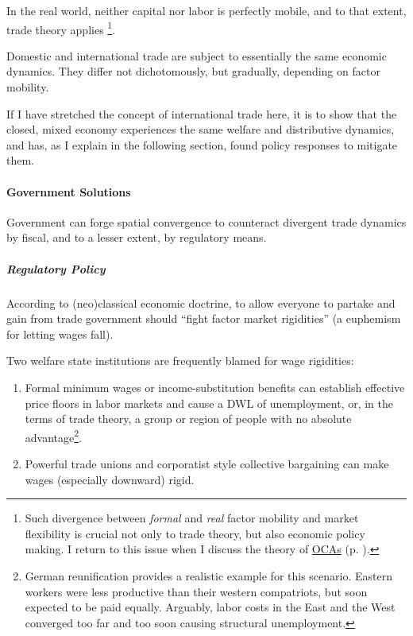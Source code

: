 In the real world, neither capital nor labor is perfectly mobile, and to that extent, trade theory applies \footnote{
	Such divergence between \emph{formal} and \emph{real} factor mobility and market flexibility is crucial not only to trade theory, but also economic policy making. I return to this issue when I discuss the theory of \hyperref[sec:OCA]{\glspl{OCA}} (p. \pageref{sec:OCA}).}. 

Domestic and international trade are subject to essentially the same economic dynamics. They differ not dichotomously, but gradually, depending on factor mobility. 

If I have stretched the concept of international trade here, it is to show that the closed, mixed economy experiences the same welfare and distributive dynamics, and has, as I explain in the following section, found policy responses to mitigate them.

\paragraph{Government Solutions} Government can forge spatial convergence to counteract divergent trade dynamics by fiscal, and to a lesser extent, by regulatory means.

\subparagraph{Regulatory Policy} According to (neo)classical economic doctrine, to allow everyone to partake and gain from trade government should ``fight factor market rigidities'' (a euphemism for letting wages fall). 

Two welfare state institutions are frequently blamed for wage rigidities:
\begin{enumerate}
	\item Formal minimum wages or income-substitution benefits can establish effective price floors in labor markets and cause a \gls{DWL} of unemployment, or, in the terms of trade theory, a group or region of people with no absolute advantage\footnote{
		German reunification provides a realistic example for this scenario. Eastern workers were less productive than their western compatriots, but soon expected to be paid equally. Arguably, labor costs in the East and the West converged too far and too soon causing structural unemployment.}.%
	\item Powerful trade unions and corporatist style collective bargaining can make wages (especially downward) rigid.
\end{enumerate}

